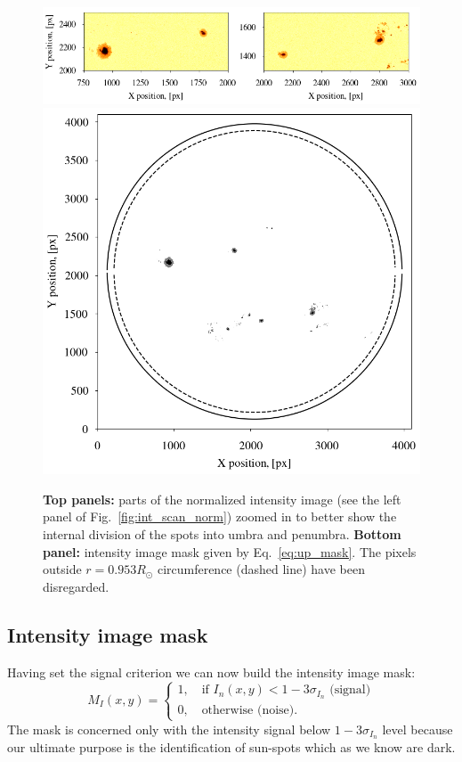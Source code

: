 \documentclass[paper=a4, fontsize=11pt]{article}
\numberwithin{equation}{section}
\numberwithin{figure}{section}
\numberwithin{table}{section}
\begin{document}
\begin{figure}[h!]
\centering
\includegraphics[scale = 0.595]{sdo_int_img_zoom}
\includegraphics[scale = 0.735]{up_mask}
\caption[]{\textbf{Top panels:} parts of the normalized intensity image (see the left panel of Fig.~\ref{fig:int_scan_norm}) 
           zoomed in to better show the internal division of the spots into umbra and penumbra.
           \textbf{Bottom panel:} intensity image mask given by Eq.~\eqref{eq:up_mask}.
           The pixels outside $r = 0.953R_\odot$ circumference (dashed line) have been disregarded.}
\label{fig:up_mask}
\end{figure}

\subsection{Intensity image mask}
Having set the signal criterion we can now build the intensity image mask:
\begin{equation}\label{eq:spt_mask}
M_I(x, y) =
\begin{cases}
1,\quad \text{if } I_n(x, y) < 1 - 3\sigma_{I_n}\text{ (signal)}\\
0,\quad \text{otherwise (noise)}.
\end{cases} 
\end{equation}
The mask is concerned only with the intensity signal below $1 - 3\sigma_{I_n}$ level because
our ultimate purpose is the identification of sun-spots which as we know are dark.
\end{document}
